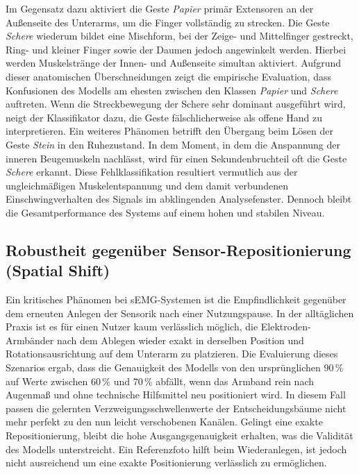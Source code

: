     Im Gegensatz dazu aktiviert die Geste \textit{Papier} primär Extensoren an der Außenseite des Unterarms, um die Finger vollständig zu strecken. Die Geste \textit{Schere} wiederum bildet eine Mischform, bei der Zeige- und Mittelfinger gestreckt, Ring- und kleiner Finger sowie der Daumen jedoch angewinkelt werden. Hierbei werden Muskelstränge der Innen- und Außenseite simultan aktiviert. Aufgrund dieser anatomischen Überschneidungen zeigt die empirische Evaluation, dass Konfusionen des Modells am ehesten zwischen den Klassen \textit{Papier} und \textit{Schere} auftreten. Wenn die Streckbewegung der Schere sehr dominant ausgeführt wird, neigt der Klassifikator dazu, die Geste fälschlicherweise als offene Hand zu interpretieren. Ein weiteres Phänomen betrifft den Übergang beim Lösen der Geste \textit{Stein} in den Ruhezustand. In dem Moment, in dem die Anspannung der inneren Beugemuskeln nachlässt, wird für einen Sekundenbruchteil oft die Geste \textit{Schere} erkannt. Diese Fehlklassifikation resultiert vermutlich aus der ungleichmäßigen Muskelentspannung und dem damit verbundenen Einschwingverhalten des Signals im abklingenden Analysefenster. Dennoch bleibt die Gesamtperformance des Systems auf einem hohen und stabilen Niveau.
    
    \subsection{Robustheit gegenüber Sensor-Repositionierung (Spatial Shift)}
    Ein kritisches Phänomen bei \ac{sEMG}-Systemen ist die Empfindlichkeit gegenüber dem erneuten Anlegen der Sensorik nach einer Nutzungspause. In der alltäglichen Praxis ist es für einen Nutzer kaum verlässlich möglich, die Elektroden-Armbänder nach dem Ablegen wieder exakt in derselben Position und Rotationsausrichtung auf dem Unterarm zu platzieren. Die Evaluierung dieses Szenarios ergab, dass die Genauigkeit des Modells von den ursprünglichen 90\,\% auf Werte zwischen 60\,\% und 70\,\% abfällt, wenn das Armband rein nach Augenmaß und ohne technische Hilfsmittel neu positioniert wird. In diesem Fall passen die gelernten Verzweigungsschwellenwerte der Entscheidungsbäume nicht mehr perfekt zu den nun leicht verschobenen Kanälen. Gelingt eine exakte Repositionierung, bleibt die hohe Ausgangsgenauigkeit erhalten, was die Validität des Modells unterstreicht. Ein Referenzfoto hilft beim Wiederanlegen, ist jedoch nicht ausreichend um eine exakte Positionierung verlässlich zu ermöglichen.

